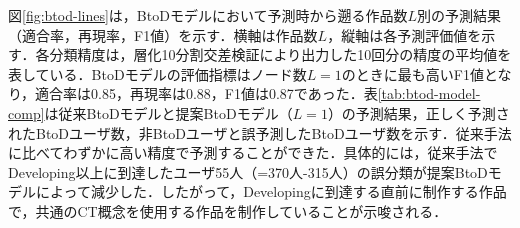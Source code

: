 \documentclass[submit,ses,noauthor]{ipsj}
\begin{document}
\begin{table}[t]
{\begin{tabular}{r|rp{60mm}|rp{60mm}}
        \end{tabular}
    }
    \vspace{-4mm}
\end{table}

図\ref{fig:btod-lines}は，BtoDモデルにおいて予測時から遡る作品数$L$別の予測結果（適合率，再現率，F1値）を示す．横軸は作品数$L$，縦軸は各予測評価値を示す．各分類精度は，層化10分割交差検証により出力した10回分の精度の平均値を表している．BtoDモデルの評価指標はノード数$L=1$のときに最も高いF1値となり，適合率は0.85，再現率は0.88，F1値は0.87であった．表\ref{tab:btod-model-comp}は従来BtoDモデルと提案BtoDモデル（$L=1$）の予測結果，正しく予測されたBtoDユーザ数，非BtoDユーザと誤予測したBtoDユーザ数を示す．従来手法に比べてわずかに高い精度で予測することができた．具体的には，従来手法でDeveloping以上に到達したユーザ55人（=370人-315人）の誤分類が提案BtoDモデルによって減少した．したがって，Developingに到達する直前に制作する作品で，共通のCT概念を使用する作品を制作していることが示唆される．
\end{document}
